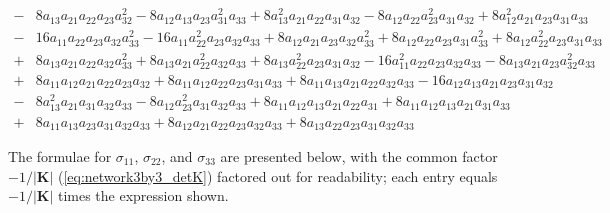 \documentclass{article}
\begin{document}
\begin{equation}
\begin{aligned}
-&8 a_{13} a_{21} a_{22} a_{23} a_{32}^{2} - 8 a_{12} a_{13} a_{23} a_{31}^{2} a_{33} + 8 a_{13}^{2} a_{21} a_{22} a_{31} a_{32} - 8 a_{12} a_{22} a_{23}^{2} a_{31} a_{32} + 8 a_{12}^{2} a_{21} a_{23} a_{31} a_{33} \\
-&16 a_{11} a_{22} a_{23} a_{32} a_{33}^{2} - 16 a_{11} a_{22}^{2} a_{23} a_{32} a_{33} + 8 a_{12} a_{21} a_{23} a_{32} a_{33}^{2} + 8 a_{12} a_{22} a_{23} a_{31} a_{33}^{2} + 8 a_{12} a_{22}^{2} a_{23} a_{31} a_{33} \\
+&8 a_{13} a_{21} a_{22} a_{32} a_{33}^{2} + 8 a_{13} a_{21} a_{22}^{2} a_{32} a_{33} + 8 a_{13} a_{22}^{2} a_{23} a_{31} a_{32} - 16 a_{11}^{2} a_{22} a_{23} a_{32} a_{33} - 8 a_{13} a_{21} a_{23} a_{32}^{2} a_{33} \\
+&8 a_{11} a_{12} a_{21} a_{22} a_{23} a_{32} + 8 a_{11} a_{12} a_{22} a_{23} a_{31} a_{33} + 8 a_{11} a_{13} a_{21} a_{22} a_{32} a_{33} - 16 a_{12} a_{13} a_{21} a_{23} a_{31} a_{32} \\
-&8 a_{13}^{2} a_{21} a_{31} a_{32} a_{33} - 8 a_{12} a_{23}^{2} a_{31} a_{32} a_{33} + 8 a_{11} a_{12} a_{13} a_{21} a_{22} a_{31} + 8 a_{11} a_{12} a_{13} a_{21} a_{31} a_{33} \\
+&8 a_{11} a_{13} a_{23} a_{31} a_{32} a_{33} + 8 a_{12} a_{21} a_{22} a_{23} a_{32} a_{33} + 8 a_{13} a_{22} a_{23} a_{31} a_{32} a_{33}
\end{aligned}
\label{eq:network3by3_detK}
\end{equation}

The formulae for $\sigma_{11}$, $\sigma_{22}$, and $\sigma_{33}$ are presented below, with the common factor $-1/|\mathbf{K}|$ (\ref{eq:network3by3_detK}) factored out for readability; each entry equals $-1/|\mathbf{K}|$ times the expression shown.
\end{document}
